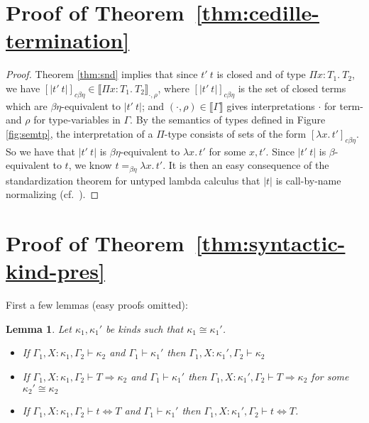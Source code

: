 \documentclass{article}
\newcommand{\interp}[1]{\llbracket #1 \rrbracket}
\newcommand{\tpsynth}[0]{\Rightarrow}
\newtheorem{lemma}[theorem]{Lemma}
\begin{document}
\section{Proof of Theorem~\ref{thm:cedille-termination}}
\begin{proof}
Theorem \ref{thm:snd} implies that since
$t'\ t$ is closed and of type $\Pi x:T_1.\ T_2$, we have
$[|t'\ t|]_{c\beta\eta}\in \interp{\Pi x:T_1.\ T_2}_{\cdot,\rho}$,
where $[|t'\ t|]_{c\beta\eta}$ is the set of closed terms which are
$\beta\eta$-equivalent to $|t'\ t|$; and
$(\cdot,\rho)\in\interp{\Gamma}$ gives interpretations $\cdot$ for
term- and $\rho$ for type-variables in $\Gamma$.  By the semantics of
types defined in Figure \ref{fig:semtp}, the
interpretation of a $\Pi$-type consists of sets of the form
$[\lambda x.\,t']_{c\beta\eta}$.  So we have that $|t'\ t|$ is $\beta\eta$-equivalent to
$\lambda x.\, t'$ for some $x, t'$.  
Since $|t'\ t|$ is $\beta$-equivalent to $t$, we know $t =_{\beta\eta} \lambda x.\, t'$.
It is then an easy consequence of the
standardization theorem for untyped lambda calculus that $|t|$ is
call-by-name normalizing (cf.~\cite{Kashima2000}).

\end{proof}

\section{Proof of Theorem~\ref{thm:syntactic-kind-pres}}
\label{sec:proof-syntactic-kind-pres}

First a few lemmas (easy proofs omitted):

\begin{lemma}
  \label{lem:ctxt-conv-class}
  Let \(\kappa_1,\kappa_1'\) be kinds such that \(\kappa_1 \cong \kappa_1'\).
  \begin{itemize}
  \item If \(\Gamma_1,X:\kappa_1,\Gamma_2 \vdash \kappa_2\) and \(\Gamma_1
    \vdash \kappa_1'\) then \(\Gamma_1,X:\kappa_1',\Gamma_2 \vdash \kappa_2\)
   
  \item If \(\Gamma_1,X:\kappa_1,\Gamma_2 \vdash T \tpsynth \kappa_2\) and
    \(\Gamma_1 \vdash \kappa_1'\) then \(\Gamma_1,X:\kappa_1',\Gamma_2 \vdash T
    \tpsynth \kappa_2\) for some \(\kappa_2' \cong \kappa_2\)

    
  \item If \(\Gamma_1,X:\kappa_1,\Gamma_2 \vdash t \Leftrightarrow T\) and
    \(\Gamma_1 \vdash \kappa_1'\) then \(\Gamma_1,X:\kappa_1',\Gamma_2 \vdash t
    \Leftrightarrow T\).
  \end{itemize}
\end{lemma}
\end{document}
